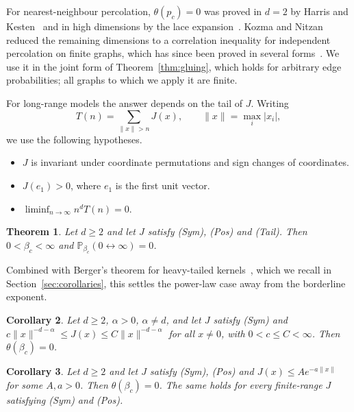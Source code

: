 \documentclass[11pt]{article}
\newtheorem{theorem}{Theorem}[section]
\newtheorem{corollary}[theorem]{Corollary}
\theoremstyle{definition}
\theoremstyle{remark}
\numberwithin{equation}{section}
\newcommand{\Pp}{\mathbb P}
\newcommand{\1}{\mathbf 1}
\newcommand{\lr}{\leftrightarrow}
\newcommand{\norm}[1]{\|#1\|}
\begin{document}
For nearest-neighbour percolation, $\theta(p_c)=0$ was proved in $d=2$ by Harris and
Kesten~\cite{Harris1960,Kesten1980} and in high dimensions by the lace
expansion~\cite{HaraSlade1990,FitznerHofstad2017}. Kozma and Nitzan~\cite{KozmaNitzan2024} reduced
the remaining dimensions to a correlation inequality for independent percolation on finite graphs,
which has since been proved in several forms~\cite{Leder2026,OpenAIZ3,BlancRenaudie2026,Gouere2026}. We use it in the
joint form of Theorem~\ref{thm:gluing}, which holds for arbitrary edge probabilities; all graphs to
which we apply it are finite.

For long-range models the answer depends on the tail of $J$. Writing
\[
T(n)=\sum_{\norm{x}>n}J(x),\qquad \norm{x}=\max_i|x_i|,
\]
we use the following hypotheses.
\begin{itemize}
\item[(Sym)] $J$ is invariant under coordinate permutations and sign changes of coordinates.
\item[(Pos)] $J(e_1)>0$, where $e_1$ is the first unit vector.
\item[(Tail)] $\liminf_{n\to\infty}n^dT(n)=0$.
\end{itemize}

\begin{theorem}\label{thm:main}
Let $d\ge2$ and let $J$ satisfy \textup{(Sym)}, \textup{(Pos)} and \textup{(Tail)}. Then
$0<\beta_c<\infty$ and $\Pp_{\beta_c}(0\lr\infty)=0$.
\end{theorem}

Combined with Berger's theorem for heavy-tailed kernels~\cite[Theorem~2.6]{Berger2002}, which we
recall in Section~\ref{sec:corollaries}, this settles the power-law case away from the borderline
exponent.

\begin{corollary}\label{cor:power}
Let $d\ge2$, $\alpha>0$, $\alpha\ne d$, and let $J$ satisfy \textup{(Sym)} and
$c\norm{x}^{-d-\alpha}\le J(x)\le C\norm{x}^{-d-\alpha}$ for all $x\ne0$, with $0<c\le C<\infty$.
Then $\theta(\beta_c)=0$.
\end{corollary}

\begin{corollary}\label{cor:exp}
Let $d\ge2$ and let $J$ satisfy \textup{(Sym)}, \textup{(Pos)} and $J(x)\le Ae^{-a\norm{x}}$ for some
$A,a>0$. Then $\theta(\beta_c)=0$. The same holds for every finite-range $J$ satisfying
\textup{(Sym)} and \textup{(Pos)}.
\end{corollary}
\end{document}
